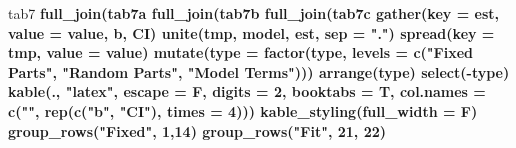 \documentclass[]{article}
\newenvironment{Shaded}{\begin{snugshade}}{\end{snugshade}}
\newcommand{\KeywordTok}[1]{\textcolor[rgb]{0.13,0.29,0.53}{\textbf{#1}}}
\newcommand{\DataTypeTok}[1]{\textcolor[rgb]{0.13,0.29,0.53}{#1}}
\newcommand{\DecValTok}[1]{\textcolor[rgb]{0.00,0.00,0.81}{#1}}
\newcommand{\StringTok}[1]{\textcolor[rgb]{0.31,0.60,0.02}{#1}}
\newcommand{\OperatorTok}[1]{\textcolor[rgb]{0.81,0.36,0.00}{\textbf{#1}}}
\newcommand{\NormalTok}[1]{#1}
\begin{document}
\begin{Shaded}
\begin{Highlighting}[]
\NormalTok{tab7 }\OperatorTok{%
\StringTok{  }\KeywordTok{full_join}\NormalTok{(tab7a }\OperatorTok{%
\StringTok{  }\KeywordTok{full_join}\NormalTok{(tab7b }\OperatorTok{%
\StringTok{  }\KeywordTok{full_join}\NormalTok{(tab7c }\OperatorTok{%
\StringTok{  }\KeywordTok{gather}\NormalTok{(}\DataTypeTok{key =}\NormalTok{ est, }\DataTypeTok{value =}\NormalTok{ value, b, CI) }\OperatorTok{%
\StringTok{  }\KeywordTok{unite}\NormalTok{(tmp, model, est, }\DataTypeTok{sep =} \StringTok{"."}\NormalTok{) }\OperatorTok{%
\StringTok{  }\KeywordTok{spread}\NormalTok{(}\DataTypeTok{key =}\NormalTok{ tmp, }\DataTypeTok{value =}\NormalTok{ value) }\OperatorTok{%
\StringTok{  }\KeywordTok{mutate}\NormalTok{(}\DataTypeTok{type =} \KeywordTok{factor}\NormalTok{(type, }\DataTypeTok{levels =} \KeywordTok{c}\NormalTok{(}\StringTok{"Fixed Parts"}\NormalTok{, }\StringTok{"Random Parts"}\NormalTok{, }\StringTok{"Model Terms"}\NormalTok{))) }\OperatorTok{%
\StringTok{  }\KeywordTok{arrange}\NormalTok{(type) }\OperatorTok{%
\StringTok{  }\KeywordTok{select}\NormalTok{(}\OperatorTok{-}\NormalTok{type) }\OperatorTok{%
\StringTok{  }\KeywordTok{kable}\NormalTok{(., }\StringTok{"latex"}\NormalTok{, }\DataTypeTok{escape =}\NormalTok{ F, }\DataTypeTok{digits =} \DecValTok{2}\NormalTok{, }\DataTypeTok{booktabs =}\NormalTok{ T,}
        \DataTypeTok{col.names =} \KeywordTok{c}\NormalTok{(}\StringTok{""}\NormalTok{, }\KeywordTok{rep}\NormalTok{(}\KeywordTok{c}\NormalTok{(}\StringTok{"b"}\NormalTok{, }\StringTok{"CI"}\NormalTok{), }\DataTypeTok{times =} \DecValTok{4}\NormalTok{))) }\OperatorTok{%
\StringTok{  }\KeywordTok{kable_styling}\NormalTok{(}\DataTypeTok{full_width =}\NormalTok{ F) }\OperatorTok{%
\StringTok{  }\KeywordTok{group_rows}\NormalTok{(}\StringTok{"Fixed"}\NormalTok{, }\DecValTok{1}\NormalTok{,}\DecValTok{14}\NormalTok{) }\OperatorTok{%
\StringTok{  }\KeywordTok{group_rows}\NormalTok{(}\StringTok{"Fit"}\NormalTok{, }\DecValTok{21}\NormalTok{, }\DecValTok{22}\NormalTok{) }\OperatorTok{%
}}}}}}}}}}}}}}
\end{Highlighting}
\end{Shaded}
\end{document}
